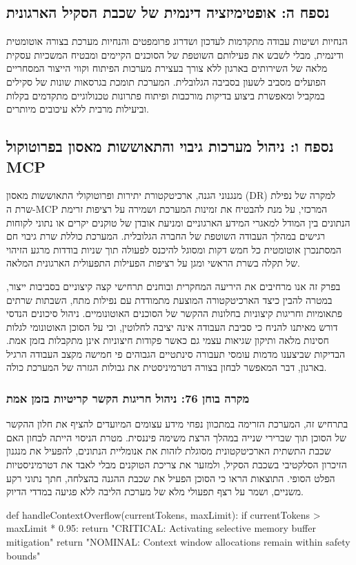 \documentclass{hebrew-academic-template}
\begin{document}
\subsection{נספח ה: אופטימיזציה דינמית של שכבת הסקיל הארגונית}
הנחיות ושיטות עבודה מתקדמות לעדכון ושדרוג פרומפטים והנחיות מערכת בצורה אוטומטית ודינמית, מבלי לשבש את פעילותם השוטפת של הסוכנים הקיימים ומבטיח המשכיות עסקית מלאה של השירותים בארגון ללא צורך בעצירת מערכות הפיתוח וקווי הייצור המסחריים הפועלים מסביב לשעון בסביבה הגלובלית. המערכת תומכת בגרסאות שונות של סקילים במקביל ומאפשרת ביצוע בדיקות מורכבות ופיתוח פתרונות טכנולוגיים מתקדמים בקלות וביעילות מרבית ללא עיכובים מיותרים.

\subsection{נספח ו: ניהול מערכות גיבוי והתאוששות מאסון בפרוטוקול MCP}
מנגנוני הגנה, ארכיטקטורת יתירות ופרוטוקולי התאוששות מאסון (DR) למקרה של נפילת שרת ה-MCP המרכזי, על מנת להבטיח את זמינות המערכת ושמירה על רציפות זרימת הנתונים בין המודל למאגרי המידע הארגוניים ומניעת אובדן של טוקנים יקרים או נתוני לקוחות רגישים במהלך העבודה השוטפת של החברה הגלובלית. המערכת כוללת שרת גיבוי חם המסתנכרן אוטומטית כל חמש דקות ומסוגל להיכנס לפעולה תוך שניות בודדות מרגע הזיהוי של תקלה בשרת הראשי ומגן על רציפות הפעילות התפעולית הארגונית המלאה.

בפרק זה אנו מרחיבים את היריעה המחקרית ובוחנים תרחישי קצה קיצוניים בסביבות ייצור, במטרה להבין כיצד הארכיטקטורה המוצעת מתמודדת עם נפילות מתח, השבתות שרתים פתאומיות וחריגות קיצוניות בחלונות ההקשר של הסוכנים האוטונומיים. ניהול סיכונים הנדסי דורש מאיתנו להניח כי סביבת העבודה אינה יציבה לחלוטין, וכי על הסוכן האוטונומי לגלות חסינות מלאה ותיקון שגיאות עצמי גם כאשר פקודות חיצוניות אינן מתקבלות בזמן אמת. הבדיקות שביצענו מדמות עומסי תעבורה סינתטיים הגבוהים פי חמישה מקצב העבודה הרגיל בארגון, דבר המאפשר לבחון בצורה דטרמיניסטית את גבולות הגזרה של המערכת כולה.

\subsubsection{מקרה בוחן 76: ניהול חריגות הקשר קריטיות בזמן אמת}
בתרחיש זה, המערכת הזרימה במתכוון נפחי מידע עצומים המיועדים להציף את חלון ההקשר של הסוכן תוך שברירי שנייה במהלך הרצת משימה פיננסית. מטרת הניסוי הייתה לבחון האם שכבת התשתית הארכיטקטונית מסוגלת לזהות את אנומליית הנתונים, להפעיל את מנגנון הזיכרון הסלקטיבי בשכבת הסקיל, ולמזער את צריכת הטוקנים מבלי לאבד את דטרמיניסטיות הפלט הסופי. התוצאות הראו כי הסוכן הפעיל את שכבת ההגנה בהצלחה, חתך נתוני רקע משניים, ושמר על רצף תפעולי מלא של מערכת הליבה ללא פגיעה במדדי הדיוק.
\begin{pythonbox}
def handleContextOverflow(currentTokens, maxLimit):
    if currentTokens > maxLimit * 0.95:
        return "CRITICAL: Activating selective memory buffer mitigation"
    return "NOMINAL: Context window allocations remain within safety bounds"
\end{pythonbox}
\end{document}
